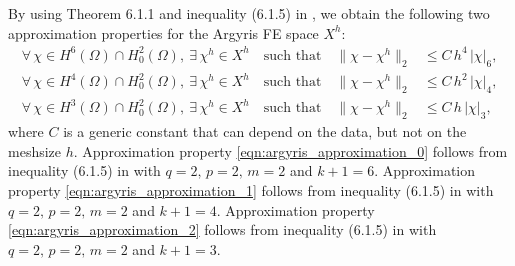 By using Theorem 6.1.1 and inequality (6.1.5) in \cite{Ciarlet}, we obtain the
following two approximation properties for the Argyris FE space $X^h$:
\begin{align}
  \forall \, \chi \in H^6(\Omega) \cap H^2_0(\Omega), \ \exists \, \chi^h \in X^h
  \quad \text{such that} \quad
  \| \chi - \chi^h \|_2
  &\leq C \, h^4 \, | \chi |_6 ,
  \label{eqn:argyris_approximation_0} \\[0.2cm]
  \forall \, \chi \in H^4(\Omega) \cap H^2_0(\Omega), \ \exists \, \chi^h \in X^h
  \quad \text{such that} \quad
  \| \chi - \chi^h \|_2
  &\leq C \, h^2 \, | \chi |_4 ,
  \label{eqn:argyris_approximation_1} \\[0.2cm]
  \forall \, \chi \in H^3(\Omega) \cap H^2_0(\Omega), \ \exists \, \chi^h \in X^h
  \quad \text{such that} \quad
  \| \chi - \chi^h \|_2
  &\leq C \, h \, | \chi |_3 ,
  \label{eqn:argyris_approximation_2}
\end{align}
where $C$ is a generic constant that can depend on the data, but not on the
meshsize $h$.  Approximation property \eqref{eqn:argyris_approximation_0}
follows from inequality (6.1.5) in \cite{Ciarlet} with $q = 2, \, p = 2, \, m =
2$ and $k+1 = 6$. Approximation property \eqref{eqn:argyris_approximation_1}
follows from inequality (6.1.5) in \cite{Ciarlet} with $q = 2, \, p = 2, \, m =
2$ and $k+1 = 4$. Approximation property \eqref{eqn:argyris_approximation_2}
follows from inequality (6.1.5) in \cite{Ciarlet} with $q = 2, \, p = 2, \, m =
2$ and $k+1 = 3$.

